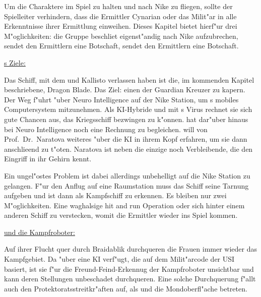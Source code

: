 \begin{remarks}
	Um die Charaktere im Spiel zu halten und nach Nike zu fliegen, sollte der Spielleiter verhindern, dass die Ermittler Cynarian oder das Milit"ar in alle Erkenntnisse ihrer Ermittlung einweihen. Dieses Kapitel bietet hierf"ur drei M"oglichkeiten: die Gruppe beschlie\3t eigenst"andig nach Nike aufzubrechen, \xl{} sendet den Ermittlern eine Botschaft, \ml{} sendet den Ermittlern eine Botschaft.

	\underline{\xl{}s Ziele:}

	Das Schiff, mit dem \xl{} und \ml{} Kallisto verlassen haben ist die, im kommenden Kapitel beschriebene, Dragon Blade. Das Ziel: einen der Guardian Kreuzer zu kapern. Der Weg f"uhrt "uber Neuro Intelligence auf der Nike Station, um \ml{}s mobiles Computersystem mitzunehmen. Als KI-Hybride und mit \ml{}s Virus rechnet sie sich gute Chancen aus, das Kriegsschiff bezwingen zu k"onnen. \xl{} hat dar"uber hinaus bei Neuro Intelligence noch eine Rechnung zu begleichen. \xl{} will von Prof.~Dr.~Naratova weiteres "uber die KI in ihrem Kopf erfahren, um sie dann anschlie\3end zu t"oten. Naratova ist neben \ml{} die einzige noch Verbleibende, die den Eingriff in ihr Gehirn kennt. 
	
	Ein ungel"ostes Problem ist dabei allerdings unbehelligt auf die Nike Station zu gelangen. F"ur den Anflug auf eine Raumstation muss das Schiff seine Tarnung aufgeben und ist dann als Kampfschiff zu erkennen. Es bleiben nur zwei M"oglichkeiten. Eine waghalsige hit and run Operation oder sich hinter einem anderen Schiff zu verstecken, womit die Ermittler wieder ins Spiel kommen.

	\underline{\xl{} und die Kampfroboter:}

	Auf ihrer Flucht quer durch Braidablik durchqueren die Frauen immer wieder das Kampfgebiet. Da \xl{} "uber eine KI verf"ugt, die auf dem Milit"arcode der USI basiert, ist sie f"ur die Freund-Feind-Erkennug der Kampfroboter unsichtbar und kann deren Stellungen unbeschadet durchqueren. Eine solche Durchquerung f"allt auch den Protektoratsstreitkr"aften auf, als \xl{} und \ml{} die Mondoberfl"ache betreten. 
\end{remarks}
\vfill
